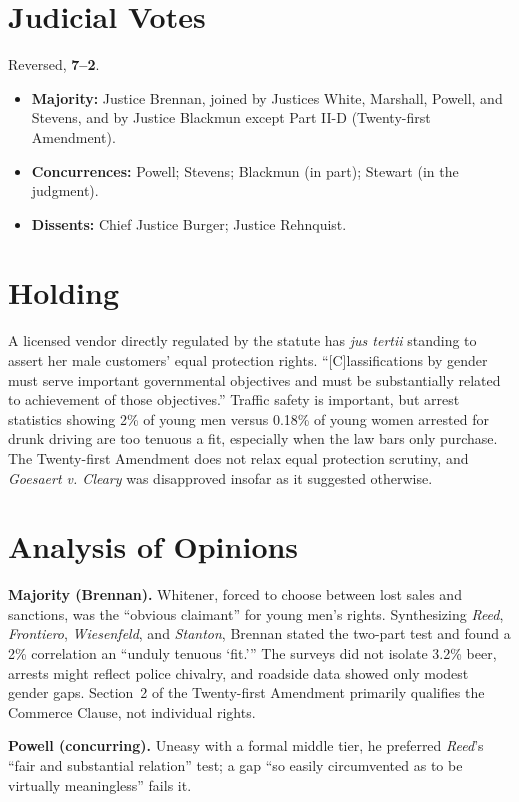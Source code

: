 \documentclass[12pt]{article}
\begin{document}
\section{Judicial Votes}

Reversed, \textbf{7--2}.
\begin{itemize}
\item \textbf{Majority:} Justice Brennan, joined by Justices White, Marshall, Powell, and Stevens, and by Justice Blackmun except Part II-D (Twenty-first Amendment).
\item \textbf{Concurrences:} Powell; Stevens; Blackmun (in part); Stewart (in the judgment).
\item \textbf{Dissents:} Chief Justice Burger; Justice Rehnquist.
\end{itemize}

\section{Holding}

A licensed vendor directly regulated by the statute has \textit{jus tertii} standing to assert her male customers' equal protection rights. ``[C]lassifications by gender must serve important governmental objectives and must be substantially related to achievement of those objectives.'' Traffic safety is important, but arrest statistics showing 2\% of young men versus 0.18\% of young women arrested for drunk driving are too tenuous a fit, especially when the law bars only purchase. The Twenty-first Amendment does not relax equal protection scrutiny, and \textit{Goesaert v. Cleary} was disapproved insofar as it suggested otherwise.

\section{Analysis of Opinions}

\textbf{Majority (Brennan).} Whitener, forced to choose between lost sales and sanctions, was the ``obvious claimant'' for young men's rights. Synthesizing \textit{Reed}, \textit{Frontiero}, \textit{Wiesenfeld}, and \textit{Stanton}, Brennan stated the two-part test and found a 2\% correlation an ``unduly tenuous `fit.''' The surveys did not isolate 3.2\% beer, arrests might reflect police chivalry, and roadside data showed only modest gender gaps. Section~2 of the Twenty-first Amendment primarily qualifies the Commerce Clause, not individual rights.

\textbf{Powell (concurring).} Uneasy with a formal middle tier, he preferred \textit{Reed}'s ``fair and substantial relation'' test; a gap ``so easily circumvented as to be virtually meaningless'' fails it.
\end{document}
